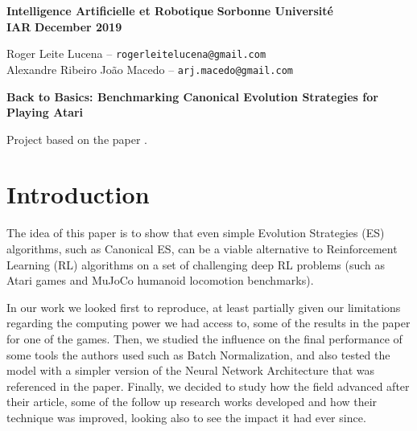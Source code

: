 \documentclass[10pt]{article} %
\begin{document}
\noindent
\normalsize\textbf{Intelligence Artificielle et Robotique} \hfill \textbf{Sorbonne Université}\\
\normalsize\textbf{IAR} \hfill \textbf{December 2019}
\begin{flushright}
{\small Roger Leite Lucena -- \texttt{rogerleitelucena@gmail.com} } \\
{\small Alexandre Ribeiro João Macedo --  \texttt{arj.macedo@gmail.com}}\vspace{20pt}
\end{flushright}
\centerline{\large \textbf{Back to Basics: Benchmarking Canonical Evolution Strategies for Playing Atari}}
\begin{center}
Project based on the paper \cite{back-to-basics}.
\end{center}

\section{Introduction}

The idea of this paper is to show that even simple Evolution Strategies (ES) algorithms, such as Canonical ES, can be a viable alternative to Reinforcement Learning (RL) algorithms on a set of challenging deep RL problems (such as Atari games and MuJoCo humanoid locomotion benchmarks). 


In our work we looked first to reproduce, at least partially given our limitations regarding the computing power we had access to, some of the results in the paper for one of the games. Then, we studied the influence on the final performance of some tools the authors used such as Batch Normalization, and also tested the model with a simpler version of the Neural Network Architecture that was referenced in the paper. Finally, we decided to study how the field advanced after their article, some of the follow up research works developed and how their technique was improved, looking also to see the impact it had ever since.
\end{document}
